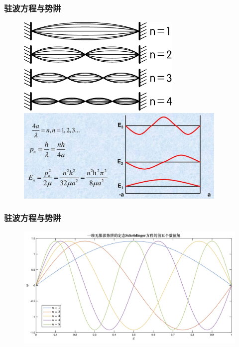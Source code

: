 \frame
{
	\frametitle{驻波方程与势阱}
\begin{figure}[h!]
\centering
\vspace{-12.5pt}
\includegraphics[height=0.32\textwidth,width=0.7\textwidth,viewport=0 0 125 75,clip]{Figures/Standing_wave.jpeg}
\vskip 2pt
\includegraphics[height=0.40\textwidth,width=0.9\textwidth,viewport=0 0 1200 550,clip]{Figures/Standing_wave-energy.jpg}
\label{Standing_Wave_1}
\end{figure}
}

\frame
{
	\frametitle{驻波方程与势阱}
\begin{figure}[h!]
\centering
\vspace{-5.5pt}
\includegraphics[height=0.55\textwidth,width=1.0\textwidth,viewport=0 0 720 400,clip]{Figures/Standing_wave-energy_1-5.jpg}
\label{Standing_Wave_2}
\end{figure}
}


